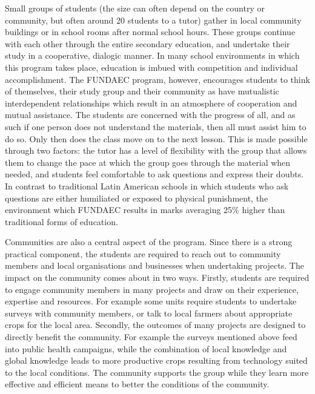 Small groups of students (the size can often depend on the country or community, but often around 20 students to a tutor) gather in local community buildings or in school rooms after normal school hours. These groups continue with each other through the entire secondary education, and undertake their study in a cooperative, dialogic manner. In many school environments in which this program takes place, education is imbued with competition and individual accomplishment. The FUNDAEC program, however, encourages students to think of themselves, their study group and their community as have mutualistic interdependent relationships which result in an atmosphere of cooperation and mutual assistance. The students are concerned with the progress of all, and as such if one person does not understand the materials, then all must assist him to do so. Only then does the class move on to the next lesson. This is made possible through two factors: the tutor has a level of flexibility with the group that allows them to change the pace at which the group goes through the material when needed, and students feel comfortable to ask questions and express their doubts. In contrast to traditional Latin American schools in which students who ask questions are either humiliated or exposed to physical punishment, the environment which FUNDAEC results in marks averaging 25\% higher than traditional forms of education. 

Communities are also a central aspect of the program. Since there is a strong practical component, the students are required to reach out to community members and local organisations and businesses when undertaking projects. The impact on the community comes about in two ways. Firstly, students are required to engage community members in many projects and draw on their experience, expertise and resources. For example some units require students to undertake surveys with community members, or talk to local farmers about appropriate crops for the local area. Secondly, the outcomes of many projects are designed to directly benefit the community. For example the surveys mentioned above feed into public health campaigns, while the combination of local knowledge and global knowledge leads to more productive crops resulting from technology suited to the local conditions. The community supports the group while they learn more effective and efficient means to better the conditions of the community. 

